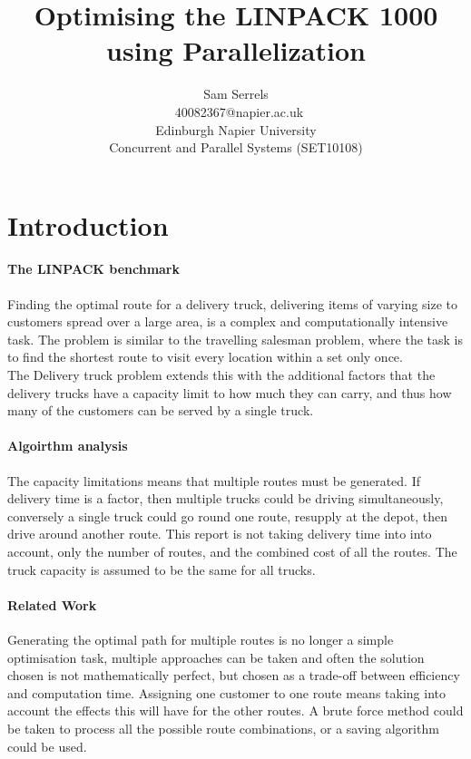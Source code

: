 \documentclass[conference]{acmsiggraph}
\title{Optimising the LINPACK 1000 using Parallelization}
\author{Sam Serrels\\\ 40082367@napier.ac.uk \\
Edinburgh Napier University\\
Concurrent and Parallel Systems (SET10108)}
\begin{document}
\maketitle

\section{Introduction}

\paragraph{The LINPACK benchmark}
Finding the optimal route for a delivery truck, delivering items of varying size to customers spread over a large area, is a complex and computationally intensive task.
The problem is similar to the travelling salesman problem, where the task is to find the shortest route to visit every location within a set only once.\\
The Delivery truck problem extends this with the additional factors that the delivery trucks have a capacity limit to how much they can carry, and thus how many of the customers can be served by a single truck. 

\paragraph{Algoirthm analysis}
The capacity limitations means that multiple routes must be generated. If delivery time is a factor, then multiple trucks could be driving simultaneously, conversely a single truck could go round one route, resupply at the depot, then drive around another route. This report is not taking delivery time into into account, only the number of routes, and the combined cost of all the routes. The truck capacity is assumed to be the same for all trucks.

\paragraph{Related Work}
Generating the optimal path for multiple routes is no longer a simple optimisation task, multiple approaches can be taken and often the solution chosen is not mathematically perfect, but chosen as a trade-off between efficiency and computation time. Assigning one customer to one route means taking into account the effects this will have for the other routes. A brute force method could be taken to process all the possible route combinations, or a saving algorithm could be used.
\end{document}
